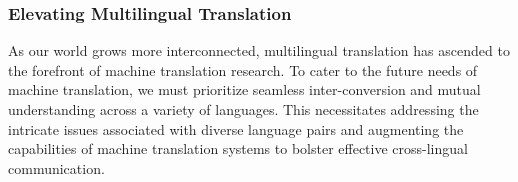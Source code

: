 \documentclass[acmsmall]{acmart}
\begin{document}



\subsubsection{Elevating Multilingual Translation}
As our world grows more interconnected, multilingual translation has ascended to the forefront of machine translation research. To cater to the future needs of machine translation, we must prioritize seamless inter-conversion and mutual understanding across a variety of languages. This necessitates addressing the intricate issues associated with diverse language pairs and augmenting the capabilities of machine translation systems to bolster effective cross-lingual communication.
\end{document}
